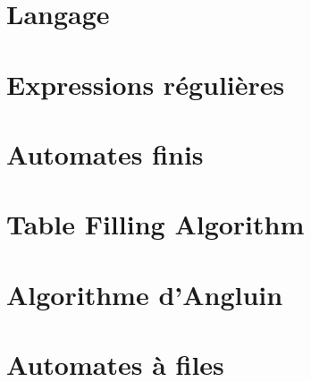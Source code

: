 \section{Langage}\label{lang}
\section{Expressions régulières}\label{regex}
\section{Automates finis}\label{adf}
\section{Table Filling Algorithm}\label{tfa}
\section{Algorithme d'Angluin}\label{angluin}
\section{Automates à files}\label{fifo}
